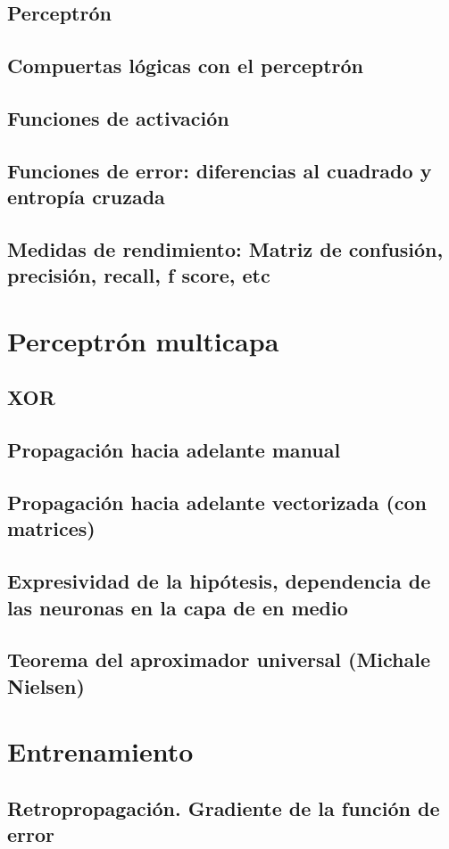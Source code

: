 \documentclass{article}
\begin{document}
\subsection{Perceptrón}
\subsection{Compuertas lógicas con el perceptrón}
\subsection{Funciones de activación}
\subsection{Funciones de error: diferencias al cuadrado y entropía cruzada}
\subsection{Medidas de rendimiento: Matriz de confusión, precisión, recall, f score, etc}
\section{ Perceptrón multicapa} %
\subsection{XOR}
\subsection{Propagación hacia adelante manual}
\subsection{Propagación hacia adelante vectorizada (con matrices)}
\subsection{Expresividad de la hipótesis, dependencia de las neuronas en la capa de en medio}
\subsection{Teorema del aproximador universal (Michale Nielsen)}
\section{Entrenamiento} %
\subsection{Retropropagación. Gradiente de la función de error}
\end{document}
